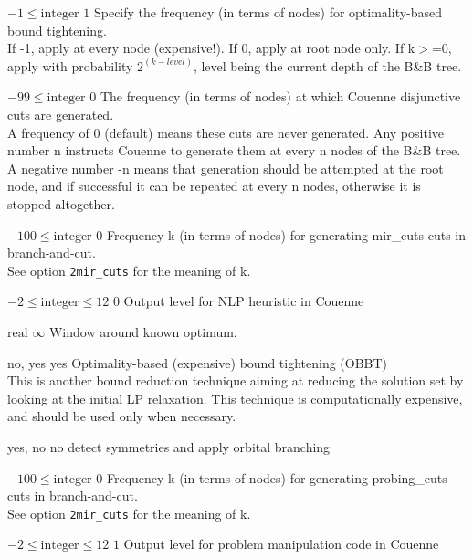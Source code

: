 %
{$-1\leq\textrm{integer}$}%
{$1$}%
{Specify the frequency (in terms of nodes) for optimality-based bound tightening.\\
If -1, apply at every node (expensive!). If 0, apply at root node only. If k$>$=0, apply with probability $2^{(k - level)}$, level being the current depth of the B\&B tree.}%
{}

%
{$-99\leq\textrm{integer}$}%
{$0$}%
{The frequency (in terms of nodes) at which Couenne disjunctive cuts are generated.\\
A frequency of 0 (default) means these cuts are never generated. Any positive number n instructs Couenne to generate them at every n nodes of the B\&B tree. A negative number -n means that generation should be attempted at the root node, and if successful it can be repeated at every n nodes, otherwise it is stopped altogether.}%
{}

%
{$-100\leq\textrm{integer}$}%
{$0$}%
{Frequency k (in terms of nodes) for generating mir\_cuts cuts in branch-and-cut.\\
See option \texttt{2mir\_cuts} for the meaning of k.}%
{}

%
{$-2\leq\textrm{integer}\leq12$}%
{$0$}%
{Output level for NLP heuristic in Couenne}%
{}

%
{$\textrm{real}$}%
{$\infty$}%
{Window around known optimum.}%
{}

%
{no, yes}%
{yes}%
{Optimality-based (expensive) bound tightening (OBBT)\\
This is another bound reduction technique aiming at reducing the solution set by looking at the initial LP relaxation. This technique is computationally expensive, and should be used only when necessary.}%
{}

%
{yes, no}%
{no}%
{detect symmetries and apply orbital branching}%
{}

%
{$-100\leq\textrm{integer}$}%
{$0$}%
{Frequency k (in terms of nodes) for generating probing\_cuts cuts in branch-and-cut.\\
See option \texttt{2mir\_cuts} for the meaning of k.}%
{}

%
{$-2\leq\textrm{integer}\leq12$}%
{$1$}%
{Output level for problem manipulation code in Couenne}%
{}

